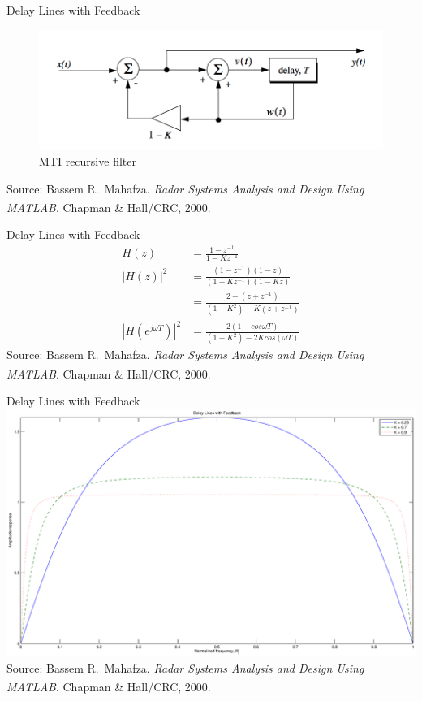 \documentclass[mathserif]{beamer}
\begin{document}
    
    
    \begin{frame}{Delay Lines with Feedback}
	\begin{figure}[h]
		\centering
		\includegraphics[width=\linewidth]{feedbackDLC} 
		\caption{MTI recursive filter}
	\end{figure}
    	\tiny{Source: Bassem R.~Mahafza. \emph{Radar Systems Analysis and Design Using MATLAB\textsuperscript{\textregistered}}. Chapman \& Hall/CRC, 2000.}
    \end{frame}
    
    
    
    \begin{frame}{Delay Lines with Feedback}
      \begin{align}
      H(z) & = \frac{1 - z^{-1}}{1-Kz^{-1}} \nonumber \\
      |H(z)|^2 & = \frac{(1-z^{-1})(1-z)}{(1-Kz^{-1})(1-Kz)} \nonumber \\
      & = \frac{2-(z+z^{-1})}{(1+K^2)-K(z+z^{-1})} \nonumber \\
      \left|{H(e^{j\omega T})}\right|^2 & = \frac{2(1-cos\omega T)}{(1+K^2)-2Kcos(\omega T)} \nonumber
      \end{align}
      \vfill
    	\tiny{Source: Bassem R.~Mahafza. \emph{Radar Systems Analysis and Design Using MATLAB\textsuperscript{\textregistered}}. Chapman \& Hall/CRC, 2000.}

    \end{frame}
    
    
    \begin{frame}{Delay Lines with Feedback}
      \includegraphics[width=\linewidth]{dlFeedback} \\
      \tiny{Source: Bassem R.~Mahafza. \emph{Radar Systems Analysis and Design Using MATLAB\textsuperscript{\textregistered}}. Chapman \& Hall/CRC, 2000.}
    \end{frame}
   
\end{document}
